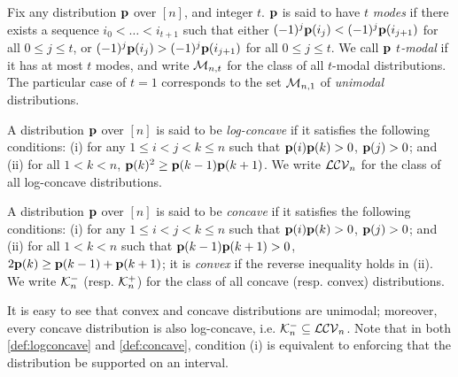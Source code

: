 \begin{definition}[$t$-modal]\label{def:tmodal}
  Fix any distribution $\mathbf{p}$ over $[n]$, and integer $t$. $\mathbf{p}$ is said to have $t$ \emph{modes} if there exists a sequence $i_0 < \dots < i_{t+1}$ such 
  that either $(-1)^j \mathbf{p}(i_j) < (-1)^j \mathbf{p}(i_{j+1})$ for all $0\leq j \leq t$, or $(-1)^j \mathbf{p}(i_j) > (-1)^j \mathbf{p}(i_{j+1})$ for all $0\leq j \leq t$. We call $\mathbf{p}$ \emph{$t$-modal} if it has at most $t$ modes, and write $\mathcal{M}_{n,t}$ for the class of all $t$-modal distributions. The particular case of $t=1$ corresponds to the set $\mathcal{M}_{n,1}$ of \emph{unimodal} distributions.
\end{definition}

\begin{definition}\label{def:logconcave}
  A distribution $\mathbf{p}$ over $[n]$ is said to be \emph{log-concave} if it satisfies the following conditions: \textsf{(i)} for any $1 \leq i < j < k \leq n$ such that $\mathbf{p}(i)\mathbf{p}(k) > 0$, $\mathbf{p}(j) > 0$; and \textsf{(ii)} for all $1 < k < n$, $\mathbf{p}(k)^2 \geq \mathbf{p}(k-1)\mathbf{p}(k+1)$. We write $\mathcal{LCV}_{n}$ for the class of all log-concave distributions.
\end{definition}

\begin{definition}\label{def:concave}
  A distribution $\mathbf{p}$ over $[n]$ is said to be \emph{concave} if it satisfies the following conditions: \textsf{(i)} for any $1 \leq i < j < k \leq n$ such that $\mathbf{p}(i)\mathbf{p}(k) > 0$, $\mathbf{p}(j) > 0$; and \textsf{(ii)} for all $1 < k < n$ such that $\mathbf{p}(k - 1)\mathbf{p}(k + 1)>0$, $2\mathbf{p}(k) \geq \mathbf{p}(k - 1)+\mathbf{p}(k + 1)$; it is \emph{convex} if the reverse inequality holds in \textsf{(ii)}. We write $\mathcal{K}_{n}^-$ (resp. $\mathcal{K}_{n}^+$) for the class of all concave (resp. convex) distributions.
\end{definition}
It is easy to see that convex and concave distributions are unimodal; moreover, every concave distribution is also log-concave, i.e. $\mathcal{K}_{n}^-\subseteq\mathcal{LCV}_{n}$. Note that in both \cref{def:logconcave} and \cref{def:concave}, condition \textsf{(i)} is equivalent to enforcing that the distribution be supported on an interval.

